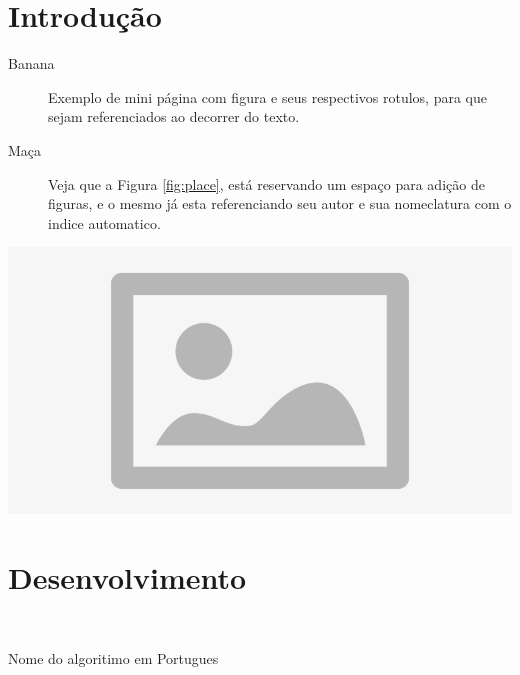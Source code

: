 
\section{Introdução}




\noindent \begin{minipage}[c]{0.6\textwidth}
  \vspace {1cm}
  \begin{description}
    \item [Banana] Exemplo de mini página com figura e seus respectivos rotulos, para que sejam referenciados ao decorrer do texto.
    \item [Maça] Veja que a Figura \ref{fig:place}, está reservando um espaço para adição de figuras, e o mesmo já esta referenciando seu autor e sua nomeclatura com o indice automatico.
  \end{description}

\end{minipage}
\begin{minipage}[c]{0.4\textwidth}
  \includegraphics[width=\textwidth]{figure/placeholder.jpg}
  	\label{fig:place}
\end{minipage}


\section{Desenvolvimento}

\begin{algorithm}[H]
  \SetAlgoLined %
   \
    \
   \caption{Nome do algoritimo em Portugues}


\end{algorithm}

